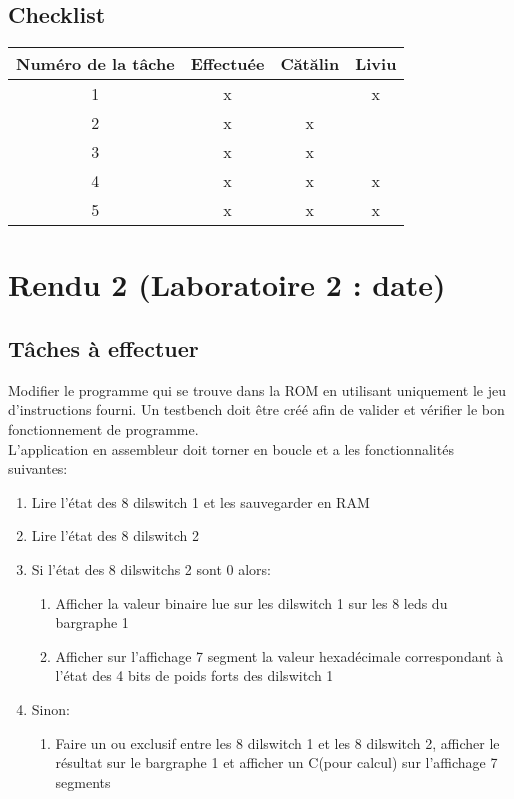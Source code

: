 \documentclass{article}
\begin{document}
    \subsection{Checklist}
    \begin{center}
        \begin{tabular}{|c|c|c|c|}
            \hline
            Numéro de la tâche & Effectuée & Cătălin & Liviu \\
            \hline
            \hline 1 & x &   & x \\ 
            \hline 2 & x & x &   \\
            \hline 3 & x & x &   \\
            \hline 4 & x & x & x \\
            \hline 5 & x & x & x \\
            \hline
        \end{tabular}
    \end{center}
    \newpage

    \section{Rendu 2 (Laboratoire 2 : date) }
    \subsection{Tâches à effectuer}
    Modifier le programme qui se trouve dans la ROM en utilisant uniquement le jeu d'instructions fourni. Un testbench doit être créé afin de valider et vérifier le bon fonctionnement de programme. \\
    L'application en assembleur doit torner en boucle et a les fonctionnalités suivantes:
    \begin{enumerate}
        \item Lire l'état des 8 dilswitch 1 et les sauvegarder en RAM
        \item Lire l'état des 8 dilswitch 2
        \item Si l'état des 8 dilswitchs 2 sont 0 alors:
        \begin{enumerate}
            \item Afficher la valeur binaire lue sur les dilswitch 1 sur les 8 leds du bargraphe 1
            \item Afficher sur l'affichage 7 segment la valeur hexadécimale correspondant à l'état des 4 bits de poids forts des dilswitch 1 
        \end{enumerate}
        \item Sinon:
        \begin{enumerate}
            \item Faire un ou exclusif entre les 8 dilswitch 1 et les 8 dilswitch 2, afficher le résultat sur le bargraphe 1 et afficher un C(pour calcul) sur l'affichage 7 segments
        \end{enumerate}
    \end{enumerate}
\end{document}
